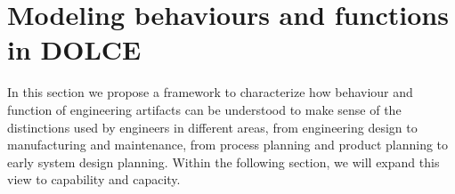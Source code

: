\documentclass[sw]{iosart2x}
\newcommand{\DOLCE}{\textsc{DOLCE}\xspace} %
\begin{document}
\section{Modeling behaviours and functions in \DOLCE \label{sec:capabilitiesEtc}}
In this section we propose a framework to characterize how behaviour and function of engineering artifacts can be understood to make sense of the distinctions used by engineers in different areas, from engineering design to manufacturing and maintenance, from process planning and product planning to early system design planning. Within the following section, we will expand this view to capability and capacity.
\end{document}
